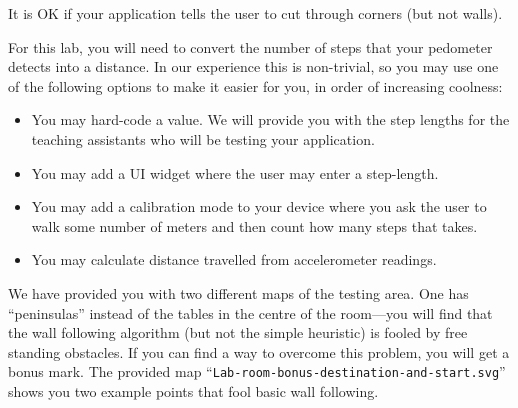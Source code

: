 \documentclass[10pt]{article}
\begin{document}

It is OK if your application tells the user to cut through corners (but not walls).

For this lab, you will need to convert the number of steps that your pedometer detects into a distance. In our experience this is non-trivial, so you may use one of the following options to make it easier for you, in order of increasing coolness:
\vspace*{-1em}
\begin{itemize}
\item You may hard-code a value. We will provide you with the step lengths for the teaching assistants who will be testing your application.
\item You may add a UI widget where the user may enter a step-length.
\item You may add a calibration mode to your device where you ask the user to walk some number of meters and then count how many steps that takes.
\item You may calculate distance travelled from accelerometer readings.
\end{itemize}
\vspace*{-1em}



We have provided you with two different maps of the testing area. One has ``peninsulas'' instead of the tables in the centre of the room---you will find that the wall following algorithm (but not the simple heuristic) is fooled by free standing obstacles. If you can find a way to overcome this problem, you will get a bonus mark. The provided map ``{\tt Lab-room-bonus-destination-and-start.svg}'' shows you two example points that fool basic wall following.
\end{document}
